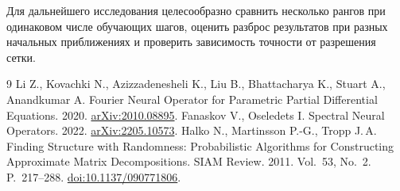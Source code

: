 \documentclass[notitle]{sibjima_preview}
\begin{document}
Для дальнейшего исследования целесообразно сравнить несколько рангов при одинаковом числе обучающих шагов, оценить разброс результатов при разных начальных приближениях и проверить зависимость точности от разрешения сетки.

\begin{thebibliography}{9}
Li Z., Kovachki N., Azizzadenesheli K., Liu B., Bhattacharya K., Stuart A., Anandkumar A.
Fourier Neural Operator for Parametric Partial Differential Equations.
2020. \href{https://arxiv.org/abs/2010.08895}{arXiv:2010.08895}.
Fanaskov V., Oseledets I.
Spectral Neural Operators.
2022. \href{https://arxiv.org/abs/2205.10573}{arXiv:2205.10573}.
Halko N., Martinsson P.-G., Tropp J.\,A.
Finding Structure with Randomness: Probabilistic Algorithms for Constructing Approximate Matrix Decompositions.
SIAM Review. 2011. Vol.~53, No.~2. P.~217--288.
\href{https://doi.org/10.1137/090771806}{doi:10.1137/090771806}.
\end{thebibliography}
\end{document}
